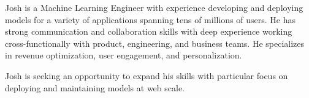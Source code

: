 

\begin{cvparagraph}

Josh is a Machine Learning Engineer with experience developing and deploying models for a variety of applications spanning tens of millions of users. 
He has strong communication and collaboration skills with deep experience working cross-functionally with product, engineering, and business teams. 
He specializes in revenue optimization, user engagement, and personalization.

Josh is seeking an opportunity to expand his skills with particular focus on deploying and maintaining models at web scale.

\end{cvparagraph}

